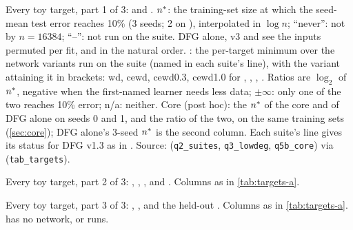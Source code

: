 \begin{table}[p]
\centering{\scriptsize\setlength{\tabcolsep}{2pt}\renewcommand{\arraystretch}{0.98}
}
\caption{Every toy target, part 1 of 3:  and  . $\nstar$: the training-set size at which the seed-mean test error reaches 10\% (3 seeds; 2 on ), interpolated in $\log n$; ``never'': not by $n=16384$; ``--'': not run on the suite. DFG alone, v3 and  see the inputs permuted per fit,  and  in the natural order. : the per-target minimum over the network variants run on the suite (named in each suite's line), with the variant attaining it in brackets: wd, cewd, cewd0.3, cewd1.0 for , , , . Ratios are $\log_2$ of $\nstar$, negative when the first-named learner needs less data; $\pm\infty$: only one of the two reaches 10\% error; n/a: neither. Core (post hoc): the $\nstar$ of the core and of DFG alone on seeds 0 and 1, and the ratio of the two, on the same training sets (\cref{sec:core}); DFG alone's 3-seed $\nstar$ is the second column. Each suite's line gives its status for DFG v1.3 as in . Source:  (\texttt{q2\_suites}, \texttt{q3\_lowdeg}, \texttt{q5b\_core}) via  (\texttt{tab\_targets}).}
\label{tab:targets-a}
\end{table}

\begin{table}[p]
\centering{\scriptsize\setlength{\tabcolsep}{2pt}\renewcommand{\arraystretch}{0.98}
}
\caption{Every toy target, part 2 of 3: , , ,  and  . Columns as in \cref{tab:targets-a}.}
\label{tab:targets-b}
\end{table}

\begin{table}[p]
\centering{\scriptsize\setlength{\tabcolsep}{2pt}\renewcommand{\arraystretch}{0.98}
}
\caption{Every toy target, part 3 of 3: , ,  and the held-out  . Columns as in \cref{tab:targets-a}.  has no network,  or  runs.}
\label{tab:targets-c}
\end{table}

